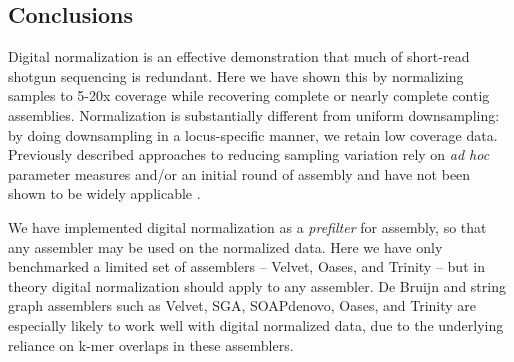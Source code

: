 \documentclass[10pt]{article}
\begin{document}
\subsection*{Conclusions}

Digital normalization is an effective demonstration
that much of short-read shotgun sequencing is redundant.  Here we have
shown this by normalizing samples to 5-20x coverage while recovering
complete or nearly complete contig assemblies.  Normalization is
substantially different from uniform downsampling: by doing
downsampling in a locus-specific manner, we retain low coverage data.
Previously described approaches to reducing sampling variation rely on
{\em ad hoc} parameter measures and/or an initial round of assembly
and have not been shown to be widely applicable
\cite{pubmed19724646,pubmed22028825}.



We have implemented digital normalization as a {\em prefilter} for assembly, so
that any assembler may be used on the normalized data.  Here we have
only benchmarked a limited set of assemblers -- Velvet, Oases, and
Trinity -- but in theory digital normalization should apply to any
assembler.  De Bruijn and string graph assemblers such as Velvet, SGA,
SOAPdenovo, Oases, and Trinity are especially likely to work well with
digital normalized data, due to the underlying reliance on k-mer
overlaps in these assemblers.

\end{document}
